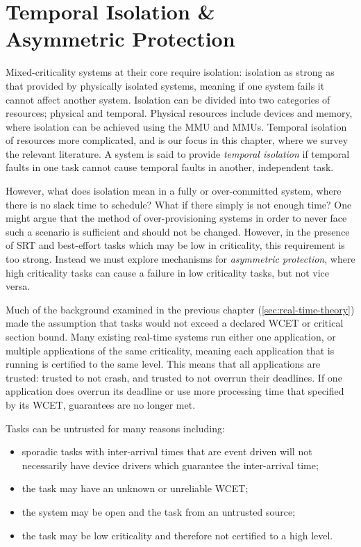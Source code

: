 \chapter{Temporal Isolation \& \\ Asymmetric Protection}
\label{chap:scheduling}

Mixed-criticality systems at their core require isolation: isolation as strong as that provided by
physically isolated systems, meaning if one system fails it cannot affect another system.  Isolation
can be divided into two categories of resources; physical and temporal. Physical resources include 
devices and memory, where isolation can be achieved using the \gls{MMU} and \IO\glspl{MMU}.
Temporal isolation of resources more complicated, and is our focus in this chapter, where
we survey the relevant literature.
A system is said to provide \emph{temporal isolation} if temporal faults in one task cannot cause
temporal faults in another, independent task. 

However, what does isolation mean in a fully or over-committed system, where there is no slack time 
to schedule? What if there simply is not enough time? One might argue that the method of
over-provisioning systems in order to never face such a scenario is sufficient and should not be
changed. However, in the presence of \gls{SRT} and best-effort tasks which may be low in
criticality, this requirement is too strong. Instead we must explore mechanisms for \emph{asymmetric
protection}, where high criticality tasks can cause a failure in low criticality tasks, but not vice
versa.

Much of the background examined in the previous chapter (\cref{sec:real-time-theory})
made the assumption that tasks would not exceed a declared \gls{WCET} or critical section bound. 
Many existing real-time systems run either one application, or multiple applications of the same
criticality, meaning each application that is running is certified to the same level.  This means
that all applications are trusted: trusted to not crash, and trusted to not overrun their deadlines.
If one application does overrun its deadline or use more processing time that specified by its
\gls{WCET}, guarantees are no longer met. 

Tasks can be untrusted for many reasons including:
\begin{itemize}
    \item sporadic tasks with inter-arrival times that are event driven will not necessarily
      have device drivers which guarantee the inter-arrival time;
    \item the task may have an unknown or unreliable \gls{WCET};
    \item the system may be open and the task from an untrusted source;
    \item the task may be low criticality and therefore not certified to a high level.
\end{itemize}


